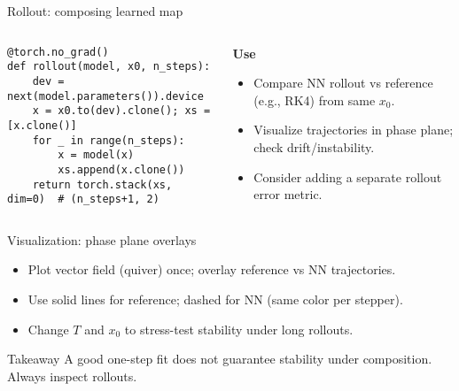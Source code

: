 \documentclass[aspectratio=169]{beamer}
\begin{document}
\begin{frame}[fragile]{Rollout: composing learned map}
\begin{columns}[T,totalwidth=\textwidth]
\begin{column}{0.56\textwidth}
\begin{lstlisting}[style=py,caption={Repeated application},label={lst:rollout}]
@torch.no_grad()
def rollout(model, x0, n_steps):
    dev = next(model.parameters()).device
    x = x0.to(dev).clone(); xs = [x.clone()]
    for _ in range(n_steps):
        x = model(x)
        xs.append(x.clone())
    return torch.stack(xs, dim=0)  # (n_steps+1, 2)
\end{lstlisting}
\end{column}
\begin{column}{0.44\textwidth}
\textbf{Use}
\begin{itemize}
  \item Compare NN rollout vs reference (e.g., RK4) from same $x_0$.
  \item Visualize trajectories in phase plane; check drift/instability.
  \item Consider adding a separate rollout error metric.
\end{itemize}
\end{column}
\end{columns}
\end{frame}

\begin{frame}{Visualization: phase plane overlays}
\begin{itemize}
  \item Plot vector field (quiver) once; overlay reference vs NN trajectories.
  \item Use solid lines for reference; dashed for NN (same color per stepper).
  \item Change $T$ and $x_0$ to stress-test stability under long rollouts.
\end{itemize}
\vspace{1ex}
\begin{block}{Takeaway}
A good one-step fit does not guarantee stability under composition. Always inspect rollouts.
\end{block}
\end{frame}
\end{document}
